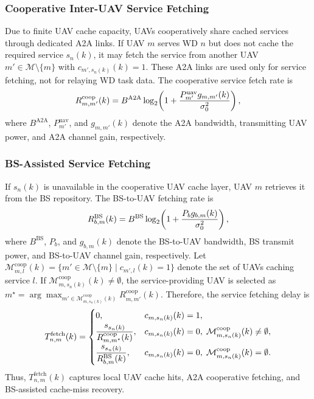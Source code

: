 \documentclass[journal]{IEEEtran}
\begin{document}
\subsubsection{Cooperative Inter-UAV Service Fetching}

Due to finite UAV cache capacity, UAVs cooperatively share cached services through dedicated A2A links. If UAV $m$ serves WD $n$ but does not cache the required service $s_n(k)$, it may fetch the service from another UAV $m'\in\mathcal{M}\setminus\{m\}$ with $c_{m',s_n(k)}(k)=1$. These A2A links are used only for service fetching, not for relaying WD task data. The cooperative service fetch rate is
\begin{equation}
\small
    R_{m,m'}^{\mathrm{coop}}(k)=
    B^{\mathrm{A2A}}\log_2\!\left(
    1+\frac{P_{m'}^{\mathrm{uav}}g_{m,m'}(k)}{\sigma_0^2}
    \right),
    \label{eq:coop_rate}
\end{equation}
where $B^{\mathrm{A2A}}$, $P_{m'}^{\mathrm{uav}}$, and $g_{m,m'}(k)$ denote the A2A bandwidth, transmitting UAV power, and A2A channel gain, respectively.

\subsubsection{BS-Assisted Service Fetching}

If $s_n(k)$ is unavailable in the cooperative UAV cache layer, UAV $m$ retrieves it from the BS repository. The BS-to-UAV fetching rate is
\begin{equation}
\small
    R_{b,m}^{\mathrm{BS}}(k)=
    B^{\mathrm{BS}}\log_2\!\left(
    1+\frac{P_b g_{b,m}(k)}{\sigma_0^2}
    \right),
    \label{eq:bs_fetch_rate}
\end{equation}
where $B^{\mathrm{BS}}$, $P_b$, and $g_{b,m}(k)$ denote the BS-to-UAV bandwidth, BS transmit power, and BS-to-UAV channel gain, respectively. Let $\mathcal{M}_{m,l}^{\mathrm{coop}}(k)=
\{m'\in\mathcal{M}\setminus\{m\}\mid c_{m',l}(k)=1\}$ denote the set of UAVs caching service $l$. If $\mathcal{M}_{m,s_n(k)}^{\mathrm{coop}}(k)\neq\emptyset$, the service-providing UAV is selected as
$m^\star=\arg\max_{m'\in\mathcal{M}_{m,s_n(k)}^{\mathrm{coop}}(k)}
R_{m,m'}^{\mathrm{coop}}(k)$. Therefore, the service fetching delay is
\begin{equation}
\small
T_{n,m}^{\mathrm{fetch}}(k)=
\begin{cases}
0, 
& c_{m,s_n(k)}(k)=1,\\[1mm]
\dfrac{s_{s_n(k)}}{R_{m,m^\star}^{\mathrm{coop}}(k)}, 
& c_{m,s_n(k)}(k)=0,\;
\mathcal{M}_{m,s_n(k)}^{\mathrm{coop}}(k)\neq\emptyset,\\[3mm]
\dfrac{s_{s_n(k)}}{R_{b,m}^{\mathrm{BS}}(k)}, 
& c_{m,s_n(k)}(k)=0,\;
\mathcal{M}_{m,s_n(k)}^{\mathrm{coop}}(k)=\emptyset.
\end{cases}
\label{eq:fetch_delay}
\end{equation}
Thus, $T_{n,m}^{\mathrm{fetch}}(k)$ captures local UAV cache hits, A2A cooperative fetching, and BS-assisted cache-miss recovery.
\end{document}
